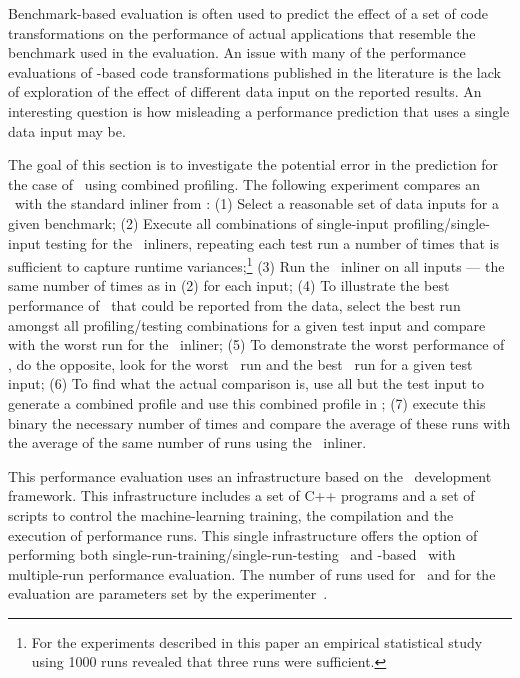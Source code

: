 
Benchmark-based evaluation is often used to predict the effect of a set of code transformations on the performance of actual applications that resemble the benchmark used in the evaluation. An issue with many of the performance evaluations of \FDO-based code transformations published in the literature is the lack of exploration of the effect of different data input on the reported results. An interesting question is how misleading a performance prediction that uses a single data input may be.

The goal of this section is to investigate the potential error in the prediction for the case of \FDI\ using combined profiling. The following experiment compares an \FDI\ with the standard inliner from \llvm: (1) Select a reasonable set of data inputs for a given benchmark; (2) Execute all combinations of single-input profiling/single-input testing for the \FDO\ inliners, repeating each test run a number of times that is sufficient to capture runtime variances;\footnote{For the experiments described in this paper an empirical statistical study using 1000 runs revealed that three runs were sufficient.}  (3) Run the \llvm\ inliner on all inputs --- the same number of times as in (2) for each input; (4) To illustrate the best performance of \FDI\ that could be reported from the data, select the best run amongst all profiling/testing combinations for a given test input and compare with the worst run for the \llvm\ inliner; (5) To demonstrate the worst performance of \FDI, do the opposite, look for the worst \FDI\ run and the best \llvm\ run for a given test input; (6) To find what the actual comparison is, use all but the test input to generate a combined profile and use this combined profile in \FDI; (7) execute this binary the necessary number of times and compare the average of these runs with the average of the same number of runs using the \llvm\ inliner.


This performance evaluation uses an infrastructure based on the \llvm\ development framework. This infrastructure includes a set of C++ programs and a set of scripts to control the machine-learning training, the compilation and the execution of performance runs. This single infrastructure offers the option of performing both single-run-training/single-run-testing \FDO\ and  \CP-based \FDO\ with multiple-run performance evaluation. The number of runs used for \CP\ and for the evaluation are parameters set by the experimenter~\cite{BerubePhD}.

